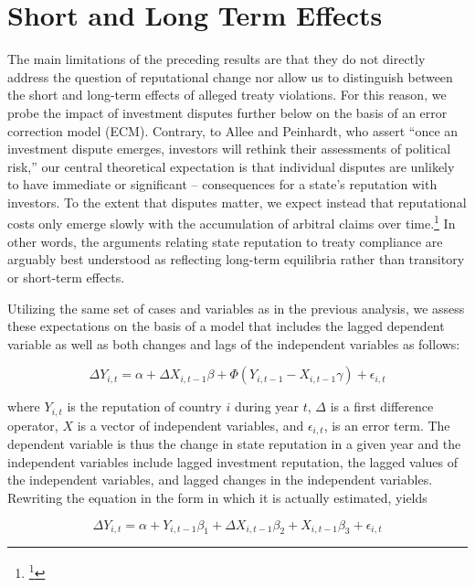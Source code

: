 \documentclass[12pt,onesided]{amsart}
\begin{document}
\section{Short and Long Term Effects}

The main limitations of the preceding results are that they do not directly address the question of reputational change nor allow us to distinguish between the short and long-term effects of alleged treaty violations. For this reason, we probe the impact of investment disputes further below on the basis of an error correction model (ECM). Contrary, to Allee and Peinhardt, who assert ``once an investment dispute emerges, investors will rethink their assessments of political risk,'' our central theoretical expectation is that individual disputes are unlikely to have immediate or significant -- consequences for a state's reputation with investors. To the extent that disputes matter, we expect instead that reputational costs only emerge slowly with the accumulation of arbitral claims over time.\footnote{\footnote{\citet[p. 402]{allee:peinhardt:2011}}} In other words, the arguments relating state reputation to treaty compliance are arguably best understood as reflecting long-term equilibria rather than transitory or short-term effects.

Utilizing the same set of cases and variables as in the previous analysis, we assess these expectations on the basis of a model that includes the lagged dependent variable as well as both changes and lags of the independent variables as follows:

\begin{equation}
\Delta Y_{i,t} = \alpha + \Delta X_{i,t-1} \beta + \Phi(Y_{i,t-1} - X_{i,t-1} \gamma) + \epsilon_{i,t}
\end{equation}

where $Y_{i,t}$ is the reputation of country $i$ during year $t$, $\Delta$ is a first difference operator, $X$ is a vector of independent variables, and $\epsilon_{i,t}$, is an error term. The dependent variable is thus the change in state reputation in a given year and the independent variables include lagged investment reputation, the lagged values of the independent variables, and lagged changes in the independent variables. Rewriting the equation in the form in which it is actually estimated, yields

\begin{equation}
\Delta Y_{i,t} = \alpha + Y_{i,t-1} \beta_{1} + \Delta X_{i,t-1} \beta_{2} + X_{i, t-1} \beta_{3} + \epsilon_{i,t}
\end{equation}
\end{document}
